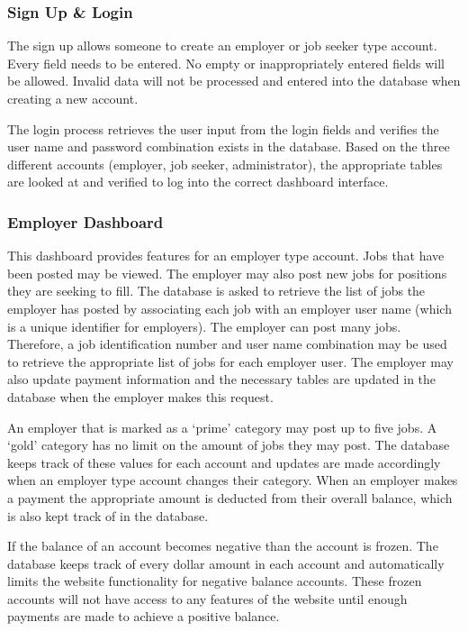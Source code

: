 \documentclass[11pt]{article}
\begin{document}
\subsubsection{Sign Up \& Login}

The sign up allows someone to create an employer or job seeker type account. Every field needs to be entered. No empty or inappropriately entered fields will be allowed. Invalid data will not be processed and entered into the database when creating a new account. \par
The login process retrieves the user input from the login fields and verifies the user name and password combination exists in the database. Based on the three different accounts (employer, job seeker, administrator), the appropriate tables are looked at and verified to log into the correct dashboard interface.

\subsubsection{Employer Dashboard}

This dashboard provides features for an employer type account. Jobs that have been posted may be viewed. The employer may also post new jobs for positions they are seeking to fill. The database is asked to retrieve the list of jobs the employer has posted by associating each job with an employer user name (which is a unique identifier for employers). The employer can post many jobs. Therefore, a job identification number and user name combination may be used to retrieve the appropriate list of jobs for each employer user. The employer may also update payment information and the necessary tables are updated in the database when the employer makes this request. \par 
	An employer that is marked as a `prime' category may post up to five jobs. A `gold' category has no limit on the amount of jobs they may post. The database keeps track of these values for each account and updates are made accordingly when an employer type account changes their category. When an employer makes a payment the appropriate amount is deducted from their overall balance, which is also kept track of in the database. \par
	If the balance of an account becomes negative than the account is frozen. The database keeps track of every dollar amount in each account and automatically limits the website functionality for negative balance accounts. These frozen accounts will not have access to any features of the website until enough payments are made to achieve a positive balance.	
	
\end{document}
